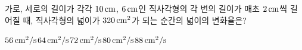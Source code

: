 가로, 세로의 길이가 각각 $10\mkern3mu \mathrm{cm}$, $6\mkern3mu \mathrm{cm}$인 직사각형의 각 변의 길이가 매초 $2\mkern3mu \mathrm{cm}$씩 길어질 때, 직사각형의 넓이가 $320\mkern3mu \mathrm{cm}^2$가 되는 순간의 넓이의 변화율은?
\begin{choices32}{$56\mkern3mu \mathrm{cm}^2/\mathrm{s}$}{$64\mkern3mu \mathrm{cm}^2/\mathrm{s}$}{$72\mkern3mu \mathrm{cm}^2/\mathrm{s}$}{$80\mkern3mu \mathrm{cm}^2/\mathrm{s}$}{$88\mkern3mu \mathrm{cm}^2/\mathrm{s}$}\end{choices32}
